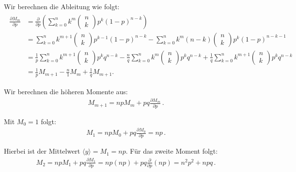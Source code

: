 Wir berechnen die Ableitung wie folgt:
\begin{align}
\begin{split}
\frac{ \partial M_m }{ \partial p } &= \frac{ \partial }{ \partial p } \left( \sum_{k = 0}^n k^m \begin{pmatrix} n \\ k \end{pmatrix} p^k (1 - p)^{n-k} \right)\\
&= \sum_{k = 0}^n k^{m + 1} \begin{pmatrix} n \\ k \end{pmatrix} p^{k - 1} (1 - p)^{n - k} - \sum_{k = 0}^n k^m (n - k) \begin{pmatrix} n \\ k \end{pmatrix} p^k (1 - p)^{n - k - 1}\\
&= \frac{1}{p} \sum_{k = 0}^n k^{m + 1} \begin{pmatrix} n \\ k \end{pmatrix} p^k q^{n - k} - \frac{n}{q} \sum_{k = 0}^n k^m \begin{pmatrix} n \\ k \end{pmatrix} p^k q^{n - k} + \frac{1}{q} \sum_{k = 0}^n k^{m + 1} \begin{pmatrix} n \\ k \end{pmatrix} p^k q^{n - k}\\
&= \frac{1}{p} M_{m + 1} - \frac{n}{1} M_m + \frac{1}{q} M_{m + 1}.
\label{eq:vl5-10}
\end{split}
\end{align}

Wir berechnen die höheren Momente aus:
\begin{align}
M_{m + 1} = n p M_m + p q \frac{ \partial M_m }{ \partial p } \,.
\label{eq:vl5-11}
\end{align}

Mit $M_0 = 1$ folgt:
\begin{align}
M_1 = n p M_0 + p q \frac{ \partial M_0 }{ \partial p } = np\,.
\label{eq:vl5-12}
\end{align}

Hierbei ist der Mittelwert $\langle y \rangle = M_1 = np$. F\"ur das zweite Moment folgt:
\begin{align}
M_2 = n p M_1 + p q \frac{ \partial M_1 }{ \partial p } = np(np) + pq \frac{ \partial }{ \partial p } (np) = n^2 p^2 + npq \,.
\label{eq:vl5-13}
\end{align}

